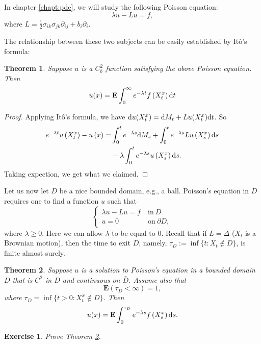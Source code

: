\documentclass[twoside, 12pt]{book}
\numberwithin{equation}{chapter}
\newtheorem{theorem}{Theorem}[section]
\newtheorem{exercise}{Exercise}[section]
\def\bE{{\mathbf E}}
\def\geq{\geqslant}
\def\p{\partial}
\def\d{\text{\rm{d}}}
\begin{document}
	In chapter \ref{chapt:pde}, we will study the following Poisson equation: 
	\[
	    \lambda u - L u =f, 
	\]
	where $L=\frac{1}{2}\sigma_{ik}\sigma_{jk}\p_{ij}+b_i\p_i$. 
	
	The relationship between these two subjects can be easily established by It\^o's formula: 
	\begin{theorem}\label{thm:FK1}
		Suppose $u$ is a $C^2_b$ function satisfying the above Poisson equation. Then
		$$
		u(x)=\mathbf{E} \int_0^{\infty} e^{-\lambda t} f\left(X^x_t\right) \d t
		$$
	\end{theorem}
	\begin{proof}
		Applying It\^o's formula, we have 
		$\d u(X^x_t)=\d M_t + Lu(X^x_t) \d t$. So 
		\[
		    \begin{aligned}
		    	e^{-\lambda t} u\left(X_t^x\right)-u\left(x\right)=&\int_0^t e^{-\lambda s} \d M_s+\int_0^t e^{-\lambda s} L u\left(X^x_s\right) \d s \\
		    	&-\lambda \int_0^t e^{-\lambda s} u\left(X^x_s\right) \d s.
		    \end{aligned}
		\]
		Taking expection, we get what we claimed. 
	\end{proof}
	
	Let us now let $D$ be a nice bounded domain, e.g., a ball. Poisson's equation in $D$ requires one to find a function $u$ such that 
	\begin{equation*}
		\begin{cases}
			\lambda u- Lu=f ~&\mbox{in}~ D\\
			u=0 ~&\mbox{on}~ \p D, 
		\end{cases}
	\end{equation*}
	where $\lambda\geq 0$. Here we can allow $\lambda$ to be equal to $0$. Recall that if $L=\Delta$ ($X_t$ is a Brownian motion), then the time to exit $D$, namely, $\tau_D := \inf\{t : X_t \notin D\}$, is finite almost surely. 
	
	\begin{theorem}\label{thm:PR-Dir}
		Suppose $u$ is a solution to Poisson's equation in a bounded domain $D$ that is $C^2$ in $D$ and continuous on $\bar{D}$. Assume also that 
		\begin{equation*}%
			\bE(\tau_D<\infty)=1, 
		\end{equation*}
		where $\tau_D=\inf\{t>0: X^x_t\notin D\}$. Then
		\[
		    u(x)=\mathbf{E} \int_0^{\tau_D} e^{-\lambda s} f\left(X_s^x\right) \d s.		
		\]
	\end{theorem}
	\begin{exercise}
		Prove Theorem \ref{thm:PR-Dir}. 
	\end{exercise}
	
\end{document}
